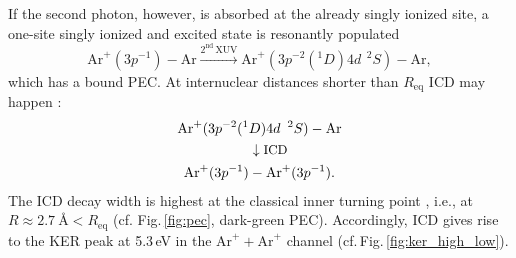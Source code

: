 \documentclass[%
 aip,
rsi,%
 amsmath,amssymb,
preprint,%
]{revtex4-1}
\begin{document}
If the second photon, however, is absorbed at the already singly ionized site, a one-site singly ionized and excited state is resonantly populated
%
	\begin{equation}
	\mathrm{Ar}^+(3p^{-1})-\mathrm{Ar} \xrightarrow[]{2^\text{nd}\,\text{XUV}} \mathrm{Ar}^+(3p^{-2}(^1D)4d\ \, ^2S)-\mathrm{Ar},
	 \label{eq:resonant}
	\end{equation}
%
which has a bound PEC. At internuclear distances shorter than $R_{\mathrm{eq}}$ ICD may happen \cite{rist2017}: 
%
	\begin{align}
	\mathrm{Ar}^+(3p^{-2}(^1&D)4d\ \, ^2S) - \mathrm{Ar} \nonumber \\ &\downarrow \text{\small{ICD}} \nonumber \\
 \mathrm{Ar}^{+}(3p^{-1}) &- \mathrm{Ar}^{+}(3p^{-1}).	
  \label{eq:icd}
	\end{align}	
%
The ICD decay width is highest at the classical inner turning point \cite{Miteva2014}, i.e., at $R \approx 2.7 \ \text{\AA} < R_{\mathrm{eq}}$ (cf. Fig.\,\ref{fig:pec}, dark-green PEC). Accordingly, ICD gives rise to the KER peak at \mbox{5.3\,eV} in the $\mathrm{Ar}^+ + \mathrm{Ar}^+$ channel (cf.\,Fig.\,\ref{fig:ker_high_low}). 
\end{document}
